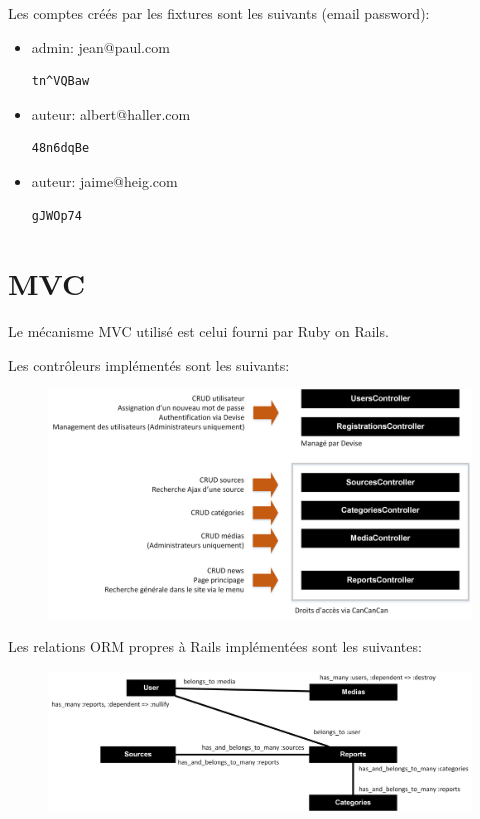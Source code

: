 \documentclass{article}
\begin{document}
\par\null\par

Les comptes créés par les fixtures sont les suivants (email password):

\begin{itemize}
\item admin: jean@paul.com \begin{verbatim}tn^VQBaw\end{verbatim}
\item auteur: albert@haller.com \begin{verbatim}48n6dqBe\end{verbatim}
\item auteur: jaime@heig.com \begin{verbatim}gJWOp74\end{verbatim}
\end{itemize}

\newpage
\section{MVC}

Le mécanisme MVC utilisé est celui fourni par Ruby on Rails.

\par\null\par

Les contrôleurs implémentés sont les suivants:

\begin{figure}[h]
  \centering
  \includegraphics[width=14cm]{mvc}
\end{figure}

Les relations ORM propres à Rails implémentées sont les suivantes:

\begin{figure}[h]
  \centering
  \includegraphics[width=14cm]{relations}
\end{figure}
\end{document}
